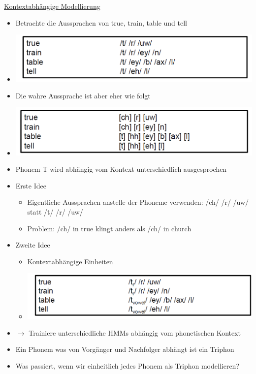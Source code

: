 \documentclass[a4paper,10pt,oneside]{article}
\begin{document}
\underline{Kontextabhängige Modellierung} \\
	\begin{itemize}
		\item Betrachte die Aussprachen von true, train, table und tell
		\item[] \includegraphics[scale=0.2]{Grafiken/13421.png}
		\item Die wahre Aussprache ist aber eher wie folgt
		\item[] \includegraphics[scale=0.2]{Grafiken/13422.png}
		\item Phonem T wird abhängig vom Kontext unterschiedlich ausgesprochen
		\item Erste Idee
			\begin{itemize}
				\item Eigentliche Aussprachen anstelle der Phoneme verwenden: /ch/ /r/ /uw/ statt /t/ /r/ /uw/
				\item Problem: /ch/ in true klingt anders als /ch/ in church
			\end{itemize}
		\item Zweite Idee
			\begin{itemize}
				\item Kontextabhängige Einheiten
				\item[] \includegraphics[scale=0.2]{Grafiken/1343.png}
			\end{itemize}
		\item[] $\rightarrow$ Trainiere unterschiedliche HMMs abhängig vom phonetischen Kontext
		\item Ein Phonem was von Vorgänger und Nachfolger abhängt ist ein Triphon
		\item Was passiert, wenn wir einheitlich jedes Phonem als Triphon modellieren? 

\end{itemize}
\end{document}
